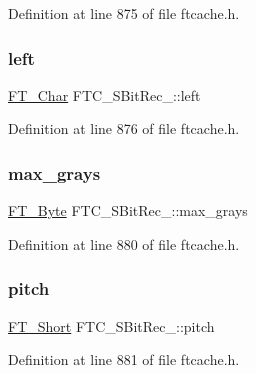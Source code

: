 Definition at line 875 of file ftcache.\+h.

\mbox{\label{struct_f_t_c___s_bit_rec___aef273749f4fdb9943500ec6df8412a94}} 
\subsubsection{\texorpdfstring{left}{left}}
{\footnotesize\ttfamily \mbox{\hyperlink{fttypes_8h_a0f851552b050883885f0a0855771f39d}{F\+T\+\_\+\+Char}} F\+T\+C\+\_\+\+S\+Bit\+Rec\+\_\+\+::left}



Definition at line 876 of file ftcache.\+h.

\mbox{\label{struct_f_t_c___s_bit_rec___a83958d4649a898312de9a7274550dff9}} 
\subsubsection{\texorpdfstring{max\_grays}{max\_grays}}
{\footnotesize\ttfamily \mbox{\hyperlink{fttypes_8h_a51f26183ca0c9f4af958939648caeccd}{F\+T\+\_\+\+Byte}} F\+T\+C\+\_\+\+S\+Bit\+Rec\+\_\+\+::max\+\_\+grays}



Definition at line 880 of file ftcache.\+h.

\mbox{\label{struct_f_t_c___s_bit_rec___a1382ec014df599e706c2c1785bc18235}} 
\subsubsection{\texorpdfstring{pitch}{pitch}}
{\footnotesize\ttfamily \mbox{\hyperlink{fttypes_8h_aa7279be89046a2563cd3d4d6651fbdcf}{F\+T\+\_\+\+Short}} F\+T\+C\+\_\+\+S\+Bit\+Rec\+\_\+\+::pitch}



Definition at line 881 of file ftcache.\+h.

\mbox{\label{struct_f_t_c___s_bit_rec___a3e558b3a04b70f00f80b862cdc94d9a2}} 
